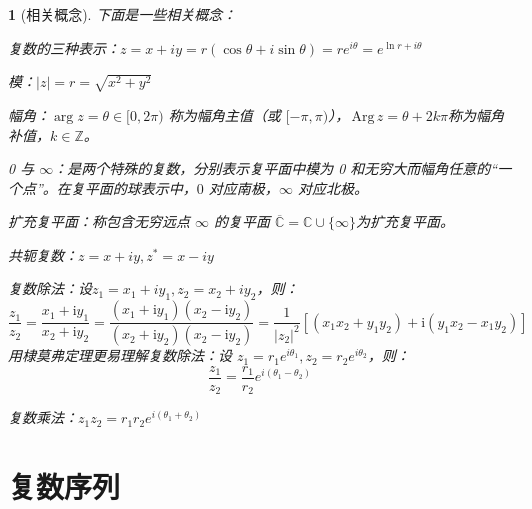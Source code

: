 \documentclass[UTF8]{report}
\def\Arg{\mathrm{\,Arg\,}}
\def\Z{\mathbb{Z}}
\def\C{\mathbb{C}}
\theoremstyle{MyLineTheoremStyle} %
\theoremstyle{MyBlockTheoremStyle} %
\theoremstyle{MySubsubsectionStyle} %
\newtheorem{definition}{}
\begin{document}
\begin{definition}[相关概念] 
    下面是一些相关概念：
\begin{circledenum}
    \item 复数的三种表示：$z = x + iy = r(\cos \theta + i\sin \theta) =  re^{i\theta} = e^{\ln r + i\theta}$
    \item 模：$|z| = r =\sqrt{x^2+y^2}$
    \item 幅角：$\arg z = \theta \in [0, 2\pi)$ 称为幅角主值（或 $[-\pi, \pi)$），$\Arg z = \theta + 2k\pi$称为幅角补值，$k\in\Z$。
    \item 0 与 $\infty$：是两个特殊的复数，分别表示复平面中模为 0 和无穷大而幅角任意的“一个点”。在复平面的球表示中，$0$ 对应南极，$\infty$ 对应北极。
    \item 扩充复平面：称包含无穷远点 $\infty$ 的复平面 $\overline{\C} = \C \cup \{\infty\}$为扩充复平面。
    \item 共轭复数：$ z = x + iy, z^* = x - iy$
    \item 复数除法：设$z_1 = x_1 + iy_1, z_2 = x_2 + iy_2$，则：
    \begin{equation}
    \frac{z_1}{z_2}= \frac{x_1+\mathrm{i}y_1}{x_2+\mathrm{i}y_2}=\frac{(x_1+\mathrm{i}y_1)(x_2-\mathrm{i}y_2)}{(x_2+\mathrm{i}y_2)(x_2-\mathrm{i}y_2)} = \frac{1}{| z_2 |^2}\left[ (x_1x_2+y_1y_2) + \mathrm{i}(y_1x_2-x_1y_2) \right]
    \end{equation}
    用棣莫弗定理更易理解复数除法：设 $z_1 = r_1e^{i\theta_1}, z_2 = r_2e^{i\theta_2}$，则： 
    \begin{equation}
    \frac{z_1}{z_2} = \frac{r_1}{r_2}e^{i(\theta_1-\theta_2)}
    \end{equation}
    \item 复数乘法：$z_1z_2 = r_1r_2e^{i(\theta_1+\theta_2)}$
\end{circledenum}



\end{definition}


\section{复数序列}
\end{document}
